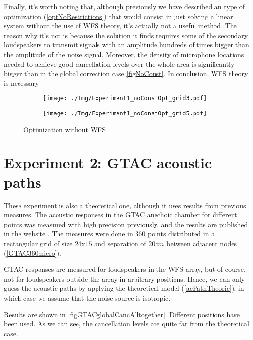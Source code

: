 Finally, it's worth noting that, although previously we have described an type of optimization (\autoref{optNoRestrictions}) that would consist in just solving a linear system without the use of WFS theory, it's actually not a useful method. The reason why it's not is because the solution it finds requires some of the secondary loudspeakers to transmit signals with an amplitude hundreds of times bigger than the amplitude of the noise signal. Moreover, the density of microphone locations needed to achieve good cancellation levels over the whole area is significantly bigger than in the global correction case \autoref{figNoConst}. In conclusion, WFS theory is necessary.

\begin{figure}[H]
	\centering
	\begin{subfigure}[b]{0.49\textwidth}
		\centering
		\texttt{[image: ./Img/Experiment1\_noConstOpt\_grid3.pdf]}
		\caption{}
	\end{subfigure}
	\begin{subfigure}[b]{0.49\textwidth}
		\centering
		\texttt{[image: ./Img/Experiment1\_noConstOpt\_grid5.pdf]}
		\caption{}
	\end{subfigure}
	\caption{Optimization without WFS}
	\label{figNoConst}
\end{figure}

\section{Experiment 2: GTAC acoustic paths}
These experiment is also a theoretical one, although it uses results from previous measures. The acoustic responses in the GTAC anechoic chamber for different points was measured with high precision previously, and the results are published in the website \cite{GTACroom}. The measures were done in 360 points distributed in a rectangular grid of size $24$x$15$ and separation of $20 \si{cm}$ between adjacent nodes (\autoref{GTAC360micro}).

GTAC responses are measured for loudspeakers in the WFS array, but of course, not for loudspeakers outside the array in arbitrary positions. Hence, we can only guess the acoustic paths by applying the theoretical model (\autoref{acPathTheoric}), in which case we assume that the noise source is isotropic.

Results are shown in \autoref{figGTACglobalCancAlltogether}. Different positions have been used. As we can see, the cancellation levels are quite far from the theoretical case.

